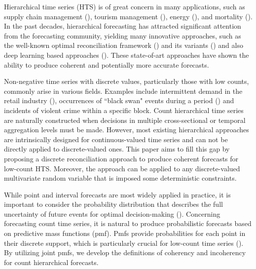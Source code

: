 \documentclass[a4paper,review,12pt,authoryear]{elsarticle}
\begin{document}
Hierarchical time series (HTS) is of great concern in many applications, such as supply chain management (\citealp{babaiDemandForecastingSupply2022}), tourism management (\citealp{kourentzesCrosstemporalCoherentForecasts2019}), energy (\citealp{nystrupTemporalHierarchiesAutocorrelation2020}), and mortality (\citealp{liHierarchicalMortalityForecasting2022}).
In the past decades, hierarchical forecasting has attracted significant attention from the forecasting community, yielding many innovative approaches, such as the well-known optimal reconciliation framework (\citealp{hyndmanOptimalCombinationForecasts2011, wickramasuriyaOptimalForecastReconciliation2019, panagiotelisProbabilisticForecastReconciliation2022}) and its variants () and also deep learning based approaches (\citealp{rangapuramEndtoEndLearningCoherent2021}).
These state-of-art approaches have shown the ability to produce coherent and potentially more accurate forecasts.

Non-negative time series with discrete values, particularly those with low counts, commonly arise in various fields. 
Examples include intermittent demand in the retail industry (\citealp{kourentzesElucidateStructureIntermittent2021}), occurrences of ``black swan" events during a period (\citealp{nikolopoulosWeNeedTalk2020}) and incidents of violent crime within a specific block.
Count hierarchical time series are naturally constructed when decisions in multiple cross-sectional or temporal aggregation levels must be made.
However, most existing hierarchical approaches are intrinsically designed for continuous-valued time series and can not be directly applied to discrete-valued ones. 
This paper aims to fill this gap by proposing a discrete reconciliation approach to produce coherent forecasts for low-count HTS. 
Moreover, the approach can be applied to any discrete-valued multivariate random variable that is imposed some deterministic constraints.  


While point and interval forecasts are most widely applied in practice, it is important to consider the probability distribution that describes the full uncertainty of future events for optimal decision-making (\citealp{gneitingProbabilisticForecasting2014}).
Concerning forecasting count time series, it is natural to produce probabilistic forecasts based on predictive mass functions (pmf). 
Pmfs provide probabilities for each point in their discrete support,
which is particularly crucial for low-count time series (\citealp{petropoulosForecastingTheoryPractice2022a}).
By utilizing joint pmfs, we develop the definitions of coherency and incoherency for count hierarchical forecasts.
\end{document}
